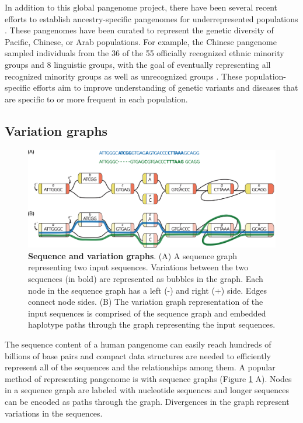 \documentclass[11pt]{ucscthesis}
\begin{document}
In addition to this global pangenome project, there have been several recent efforts to establish ancestry-specific pangenomes for underrepresented populations \cite{pacific_pangenome_2024,chinese_pangenome_2023,arab_pangenome_2024}.
These pangenomes have been curated to represent the genetic diversity of Pacific, Chinese, or Arab populations.
For example, the Chinese pangenome sampled individuals from the 36 of the 55 officially recognized ethnic minority groups and 8 linguistic groups, with the goal of eventually representing all recognized minority groups as well as unrecognized groups \cite{chinese_pangenome_2023}.
These population-specific efforts aim to improve understanding of genetic variants and diseases that are specific to or more frequent in each population.


\subsection{Variation graphs}
\begin{figure}
    \centering
    \includegraphics[width=\columnwidth]{example_graph.pdf}
    \caption[Sequence and variation graphs]{\textbf{Sequence and variation graphs}. (A) A sequence graph representing two input sequences. Variations between the two sequences (in bold) are represented as bubbles in the graph. Each node in the sequence graph has a left (-) and right (+) side. Edges connect node sides. (B) The variation graph representation of the input sequences is comprised of the sequence graph and embedded haplotype paths through the graph representing the input sequences.}
    \label{fig:example_graph}
\end{figure}

The sequence content of a human pangenome can easily reach hundreds of billions of base pairs and compact data structures are needed to efficiently represent all of the sequences and the relationships among them. 
A popular method of representing pangenome is with sequence graphs (Figure \ref{fig:example_graph} A).
Nodes in a sequence graph are labeled with nucleotide sequences and longer sequences can be encoded as paths through the graph.
Divergences in the graph represent variations in the sequences.
\end{document}
